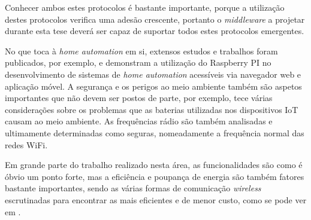 Conhecer ambos estes protocolos é bastante importante, porque a utilização destes protocolos verifica uma adesão crescente, portanto o \textit{middleware} a projetar durante esta tese deverá ser capaz de suportar todos estes protocolos emergentes.


No que toca à \textit{home automation} em si, extensos estudos e trabalhos foram publicados, por exemplo, \cite{iot-home-automation} e \cite{iot-home-automation-android} demonstram a utilização do Raspberry PI no desenvolvimento de sistemas de \textit{home automation} acessíveis via navegador web e aplicação móvel. A segurança e os perigos ao meio ambiente também são aspetos importantes que não devem ser postos de parte, por exemplo, \cite{iot-home-automation-android} tece várias considerações sobre os problemas que as baterias utilizadas nos dispositivos IoT causam ao meio ambiente. As frequências rádio são também analisadas e ultimamente determinadas como seguras, nomeadamente a frequência normal das redes WiFi.

Em grande parte do trabalho realizado nesta área, as funcionalidades são como é óbvio um ponto forte, mas a eficiência e poupança de energia são também fatores bastante importantes, sendo as várias formas de comunicação \textit{wireless} escrutinadas para encontrar as mais eficientes e de menor custo, como se pode ver em \cite{iot-home-automation-overview}.